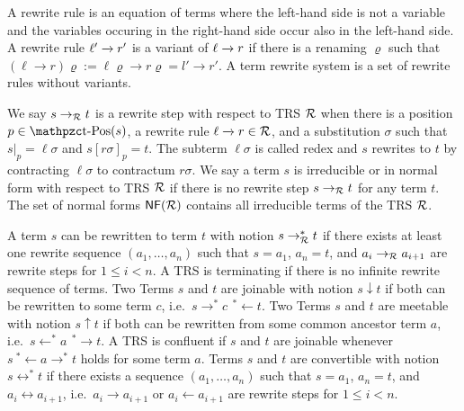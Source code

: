 \begin{definition}\label{def:rewriterule}
	A {\myem rewrite rule} is an equation of terms where the left-hand side is not a variable
	and the variables occuring in the right-hand side occur also in the left-hand side.
	A rewrite rule $\ell'\xrightarrow[{}]{} r'$ is a {\myem variant} of $\ell\xrightarrow[{}]{} r$ if there is a renaming $\varrho$
	such that 
	$(\ell\rightarrow r)\varrho := \ell\varrho\rightarrow r\varrho = l'\rightarrow r'$.
	A {\myem term rewrite system} is a set of rewrite rules without variants.
\end{definition}
%
\begin{definition}
	We say $s\rightarrow_{\mathcal R} t$ is a 
	{\myem rewrite step} 
	 with respect to TRS ${\mathcal R}$ 
	when there is a position $p \in \pos(s)$, 
	a rewrite rule $\ell\xrightarrow[{}]{} r\in{\mathcal R}$, 
	and a substitution $\sigma$ such that
	$s|_p=\ell\sigma$ and $s[r\sigma]_p = t$.
		The subterm $\ell\sigma$ is called {\myem redex} and
	$s$ rewrites to $t$ by {\myem contracting} $\ell\sigma$ to {\myem contractum} $r\sigma$.
	We say a term $s$ is {\myem irreducible} or in {\myem normal form} with respect to TRS ${\mathcal R}$ if there is no rewrite step $s\rightarrow_{\mathcal R} t$ for any term $t$. 
	The set of normal forms $\mathsf{NF}({\mathcal R})$ contains all irreducible terms of the TRS ${\mathcal R}$.
	\end{definition}
%
%
\begin{definition}
	A term $s$ can be rewritten to term $t$ with notion $s\rightarrow^*_{\mathcal R} t$ 
	if there exists at least one {\myem rewrite sequence} $(a_1,\ldots ,a_n)$ such that
	$s=a_1$, $a_n=t$, and $a_i\rightarrow_{\mathcal R} a_{i+1}$ are rewrite steps for $1\leq i<n$.
	A TRS is {\myem terminating} if there is no infinite rewrite sequence of terms.
	Two Terms $s$ and $t$ are {\myem joinable} with notion $s\downarrow t$ 
	if both can be rewritten to some term $c$, i.e.~$s \rightarrow^*c\ \, ^*\!\!\leftarrow t$.
%	
	Two Terms $s$ and $t$ are {\myem meetable} with notion $s\uparrow t$ 
	if both can be rewritten from some common ancestor term $a$, i.e.~$s \leftarrow^*a\ \, ^*\!\!\rightarrow t$.
%
	A TRS is {\myem confluent } if $s$ and $t$ are joinable whenever $s\ ^*\!\!\leftarrow a \rightarrow^* t$ holds for some term $a$.
	Terms $s$ and $t$ are {\myem convertible} with notion $s\leftrightarrow^* t$ 
	if there exists a sequence $(a_1,\ldots ,a_n)$ such that
	$s=a_1$, $a_n=t$, and $a_i\leftrightarrow a_{i+1}$, i.e.~$a_i\rightarrow a_{i+1}$ or $a_i\leftarrow a_{i+1}$ are rewrite steps for $1\leq i<n$.
\end{definition}
